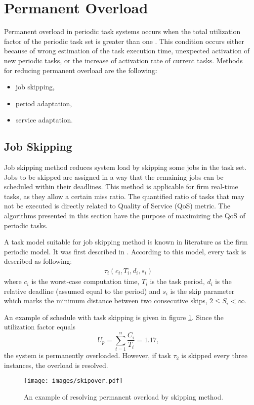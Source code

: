 \section{Permanent Overload}

Permanent overload in periodic task systems occurs when the total utilization factor of the periodic task set is greater than one \cite{buttazzo2011hard}. 
This condition occurs either because of wrong estimation of the task execution time, unexpected activation of new periodic tasks, or the increase of activation rate of current tasks.
Methods for reducing permanent overload are the following:
\begin{itemize}
	\item{job skipping,}
	\item{period adaptation,}
	\item{service adaptation.}
\end{itemize}

\subsection{Job Skipping}
\label{skip_algs}
Job skipping method reduces system load by skipping some jobs in the task set. Jobs to be skipped are assigned in a way that the remaining jobs can be scheduled within their deadlines.
This method is applicable for firm real-time tasks, as they allow a certain miss ratio. 
The quantified ratio of tasks that may not be executed is directly related to Quality of Service 
(QoS) metric. 
The algorithms presented in this section have the purpose of maximizing the QoS of periodic tasks.

A task model suitable for job skipping method is known in literature as the firm periodic model.
It was first described in \cite{koren1995skip}.
According to this model, every task is described as following:
\begin{align*}
\tau_i(c_i, T_i, d_i, s_i)
\end{align*}
where $c_i$ is the worst-case computation time, $T_i$ is the task period, $d_i$ is the relative deadline (assumed equal to the period) and $s_i$ is the skip parameter which marks the minimum distance between two consecutive skips, \(2 \leq S_i < \infty\).

An example of schedule with task skipping is given in figure \ref{skipover}. 
Since the utilization factor equals 
\begin{equation*}
U_p = \sum_{i=1}^{n} \frac{C_i}{T_i} = 1.17,
\end{equation*}
the system is permanently overloaded. 
However, if task \(\tau_2\) is skipped every three instances, the overload is resolved.
\\
\begin{figure}[ht]
    \centering
    \texttt{[image: images/skipover.pdf]}
    \caption{An example of resolving permanent overload by skipping method.}
    \label{skipover}
\end{figure}

